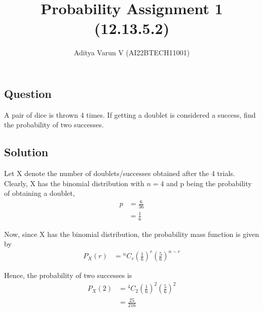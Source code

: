 \documentclass[12pt,twocolumn,notitlepage]{article}
\title{Probability Assignment 1 (12.13.5.2)}
\author{Aditya Varun V (AI22BTECH11001)}
\date{}
\providecommand{\brak}[1]{\ensuremath{\left(#1\right)}}
\newcommand*{\comb}[2]{{}^{#1}C_{#2}}
\begin{document}
\maketitle
\subsection*{Question}
A pair of dice is thrown 4 times. If getting a doublet is considered a success, find
the probability of two successes.


\subsection*{Solution}

Let X denote the number of doublets/successes obtained after the 4 trials. Clearly, X has the binomial distribution with $n=4$ and p being the probability of obtaining a doublet,
\begin{align}
    p &= \frac{6}{36} \\
    &= \frac{1}{6} 
\end{align}

Now, since X has the binomial distribution, the probability mass function is given by
\begin{align}
    P_X\brak{r} &= \comb{n}{r}\brak{\frac{1}{6}}^{r}\brak{\frac{5}{6}}^{n-r} 
\end{align}

Hence, the probability of two successes is
\begin{align}
    P_X\brak{2} &= \comb{4}{2}\brak{\frac{1}{6}}^{2}\brak{\frac{5}{6}}^{2} \\
    &= \frac{25}{216} 
\end{align}
\end{document}
